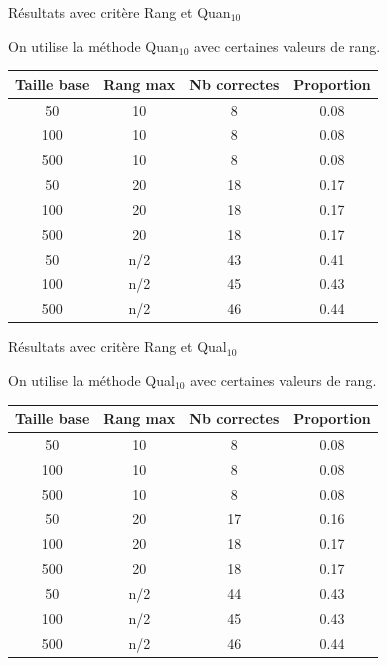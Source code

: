 \documentclass{beamer}
\begin{document}
\begin{frame}{Résultats avec critère Rang et Quan$_{10}$}

On utilise la méthode Quan$_{10}$ avec certaines valeurs de rang.
\begin{tabular}{|c|c|c|c|}
   \hline
   Taille base & Rang max & Nb correctes & Proportion\\
   \hline
   50 & 10  & 8 & 0.08  \\
   \hline
   100 & 10  & 8 & 0.08  \\
   \hline
   500 & 10  & 8 & 0.08  \\
   \hline
   \hline
   50 & 20 & 18 & 0.17  \\
   \hline
   100 & 20 & 18 & 0.17  \\
   \hline
   500 & 20 & 18 & 0.17  \\
   \hline
   50 & n/2 & 43 & 0.41  \\
   \hline
   100 & n/2 & 45 & 0.43  \\
   \hline
   500 & n/2 & 46 & 0.44  \\
   \hline
\end{tabular}

\end{frame}

\begin{frame}{Résultats avec critère Rang et Qual$_{10}$}

On utilise la méthode Qual$_{10}$ avec certaines valeurs de rang.
\begin{tabular}{|c|c|c|c|}
   \hline
   Taille base & Rang max & Nb correctes & Proportion\\
   \hline
   50 & 10  & 8 & 0.08  \\
   \hline
   100 & 10  & 8 & 0.08  \\
   \hline
   500 & 10  & 8 & 0.08  \\
   \hline
   \hline
   50 & 20  & 17 & 0.16  \\
   \hline
   100 & 20 & 18 & 0.17  \\
   \hline
   500 & 20 & 18 & 0.17  \\
   \hline
   50 & n/2 & 44 & 0.43  \\
   \hline
   100 & n/2 & 45 & 0.43  \\
   \hline
   500 & n/2 & 46 & 0.44  \\
   \hline
\end{tabular}
\end{frame}
\end{document}
